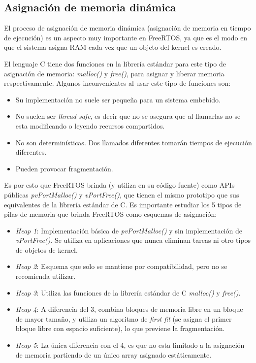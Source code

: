 \documentclass{IEEEtran}
\begin{document}
\subsection{Asignación de memoria dinámica}
El proceso de asignación de memoria dinámica (asignación de memoria en tiempo de ejecución) es un aspecto muy importante en FreeRTOS, ya que es el modo en que el sistema asigna RAM cada vez que un objeto del kernel es creado.

El lenguaje C tiene dos funciones en la librería estándar para este tipo de asignación de memoria: \textit{malloc()} y \textit{free()}, para asignar y liberar memoria respectivamente. Algunos inconvenientes al usar este tipo de funciones son:

\begin{itemize}
    \item Su implementación no suele ser pequeña para un sistema embebido.
    \item No suelen ser \textit{thread-safe}, es decir que no se asegura que al llamarlas no se esta modificando o leyendo recursos compartidos.
    \item No son determinísticas. Dos llamados diferentes tomarán tiempos de ejecución diferentes.
    \item Pueden provocar fragmentación.
\end{itemize}

Es por esto que FreeRTOS brinda (y utiliza en su código fuente) como APIs públicas \textit{pvPortMalloc()} y \textit{vPortFree()}, que tienen el mismo prototipo que sus equivalentes de la librería estándar de C. Es importante estudiar los 5 tipos de pilas de memoria que brinda FreeRTOS como esquemas de asignación:

\begin{itemize}
    \item \textit{Heap 1}: Implementación básica de \textit{pvPortMalloc()} y sin implementación de \textit{vPortFree()}. Se utiliza en aplicaciones que nunca eliminan tareas ni otro tipos de objetos de kernel.
    \item \textit{Heap 2}: Esquema que solo se mantiene por compatibilidad, pero no se recomienda utilizar.
    \item \textit{Heap 3}: Utiliza las funciones de la librería estándar de C \textit{malloc()} y \textit{free()}.
    \item \textit{Heap 4}: A diferencia del 3, combina bloques de memoria libre en un bloque de mayor tamaño, y utiliza un algoritmo de \textit{first fit} (se asigna el primer bloque libre con espacio suficiente), lo que previene la fragmentación.
    \item \textit{Heap 5}: La única diferencia con el 4, es que no esta limitado a la asignación de memoria partiendo de un único array asignado estáticamente.
\end{itemize}
\end{document}
